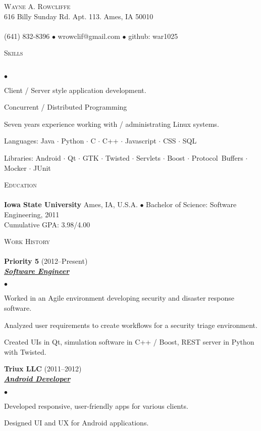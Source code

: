 \documentclass{article}
\newcommand{\lineunder} {
	\vspace*{-8pt} \\ \hspace*{-18pt} \hrulefill \\
}
\newcommand{\header}[1] {
	{\hspace*{-15pt}\vspace*{6pt} \textsc{#1}} \vspace*{-6pt} \lineunder
}
\newcommand{\employer}[3] {
	{ \textbf{#1} (#2)\\ \underline{\textbf{\emph{#3}}}\\  }
}
\newcommand{\contact}[4] {
	\vspace*{-8pt}\begin{center}{\LARGE \scshape {#1}}\\#2 \lineunder#3 $\bullet$ #4\end{center}\vspace*{-8pt}
}
\newenvironment{achievements} {
	\begin{list}{$\bullet$}
		{\topsep 0pt \itemsep -2pt}
	}{
		\vspace*{4pt}\end{list}
	}
\newcommand{\school}[4] {
	\textbf{#1} #2 $\bullet$ #3\\
	\hspace*{15pt}#4 \\
	\vspace*{5pt}
}
\newcommand{\subject}[1] {\mbox{#1} $\cdot$}
\newcommand{\lastsubject}[1] {\mbox{#1}}
\begin{document}
\small
\smallskip
\vspace*{-44pt}

\contact{Wayne A. Rowcliffe}
{616 Billy Sunday Rd. Apt. 113. Ames, IA 50010}
{(641) 832-8396 $\bullet$ wrowclif@gmail.com}%
{github: war1025}

\header{Skills}

	\begin{achievements}
		\item{Client / Server style application development.}
		\item{Concurrent / Distributed Programming}
		\item{Seven years experience working with / administrating Linux systems.}
		\item{Languages:
			\subject{Java}
			\subject{Python}
			\subject{C}
			\subject{C++}
			\subject{Javascript}
			\subject{CSS}
			\lastsubject{SQL}
		}
		\item{Libraries:
			\subject{Android}
			\subject{Qt}
			\subject{GTK}
			\subject{Twisted}
			\subject{Servlets}
			\subject{Boost}
			\subject{Protocol Buffers}
			\subject{Mocker}
			\lastsubject{JUnit}
		}
	\end{achievements}

\header{Education}

	\school{Iowa State University}{Ames, IA, U.S.A.}{Bachelor of Science: Software Engineering, 2011}
	{Cumulative GPA: 3.98/4.00}

\header{Work History}

	\employer{Priority 5}{2012--Present}{Software Engineer}
		\begin{achievements}
			\item{Worked in an Agile environment developing security and disaster response software.}
			\item{Analyzed user requirements to create workflows for a security triage environment.}
			\item{Created UIs in Qt, simulation software in C++ / Boost, REST server in Python with Twisted.}
		\end{achievements}

	\employer{Triux LLC}{2011--2012}{Android Developer}
		\begin{achievements}
			\item{Developed responsive, user-friendly apps for various clients.}
			\item{Designed UI and UX for Android applications.}
		\end{achievements}
\end{document}
